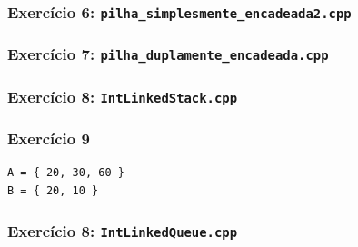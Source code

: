 \documentclass[aspectratio=169]{beamer}
\begin{document}
\begin{frame}[fragile]\frametitle{Exercício 6: \texttt{pilha\_simplesmente\_encadeada2.cpp}}
\fontsize{6pt}{6pt}\selectfont{

}
\end{frame}

\begin{frame}[fragile]\frametitle{Exercício 7: \texttt{pilha\_duplamente\_encadeada.cpp}}
\fontsize{5pt}{5pt}\selectfont{

}
\end{frame}

\begin{frame}[fragile]\frametitle{Exercício 8: \texttt{IntLinkedStack.cpp}}
\fontsize{3pt}{5pt}\selectfont{

}
\end{frame}

\begin{frame}[fragile]\frametitle{Exercício 9}
\begin{verbatim}
A = { 20, 30, 60 }
B = { 20, 10 }
\end{verbatim}
\end{frame}

\begin{frame}[fragile]\frametitle{Exercício 8: \texttt{IntLinkedQueue.cpp}}
\fontsize{3pt}{5pt}\selectfont{

}
\end{frame}

\end{document}
